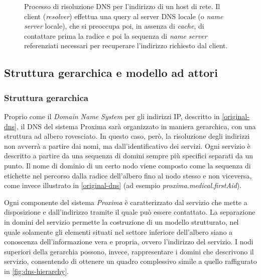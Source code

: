 \documentclass[a4paper,12pt]{report}
\begin{document}
\begin{description}
\begin{figure}[H]
		\caption{Processo di risoluzione DNS per l'indirizzo di un host di rete. Il client (\emph{resolver}) effettua una query al server DNS locale (o \emph{name server} locale), che si preoccupa poi, in assenza di \emph{cache}, di contattare prima la radice e poi la sequenza di \emph{name server} referenziati necessari per recuperare l'indirizzo richiesto dal client.}
		\label{fig:dns-resolution}
	\end{figure}
\end{description}

\subsection{Struttura gerarchica e modello ad attori} 
\subsubsection{Struttura gerarchica}\label{dns-hierarchy}
Proprio come il \emph{Domain Name System} per gli indirizzi IP, descritto in \autoref{original-dns}, il DNS del sistema Proxima sarà organizzato in maniera gerarchica, con una struttura ad albero rovesciato. In questo caso, però, la risoluzione degli indirizzi non avverrà a partire dai nomi, ma dall'identificativo dei servizi. Ogni servizio è descritto a partire da una sequenza di domini sempre più specifici separati da un punto. Il nome di dominio di un certo nodo viene composto come la sequenza di etichette nel percorso dalla radice dell'albero fino al nodo stesso e non viceversa, come invece illustrato in \autoref{original-dns} (ad esempio \emph{proxima.medical.firstAid}). 

Ogni componente del sistema \emph{Proxima} è caratterizzato dal servizio che mette a disposizione e dall'indirizzo tramite il quale può essere contattato. La separazione in domini del servizio permette la costruzione di un modello strutturato, nel quale solamente gli elementi situati nel settore inferiore dell'albero siano a conoscenza dell'informazione vera e propria, ovvero l'indirizzo del servizio. I nodi superiori della gerarchia possono, invece, rappresentare i domini che descrivono il servizio, consentendo di ottenere un quadro complessivo simile a quello raffigurato in \autoref{fig:dns-hierarchy}.
\end{document}
